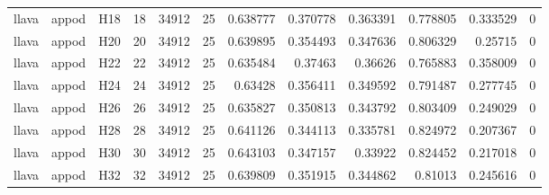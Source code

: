 \begin{longtable}{lllrrrrrrrrr}
llava & appod & H18 & 18 & 34912 & 25 & 0.638777 & 0.370778 & 0.363391 & 0.778805 & 0.333529 & 0 \\
llava & appod & H20 & 20 & 34912 & 25 & 0.639895 & 0.354493 & 0.347636 & 0.806329 & 0.25715 & 0 \\
llava & appod & H22 & 22 & 34912 & 25 & 0.635484 & 0.37463 & 0.36626 & 0.765883 & 0.358009 & 0 \\
llava & appod & H24 & 24 & 34912 & 25 & 0.63428 & 0.356411 & 0.349592 & 0.791487 & 0.277745 & 0 \\
llava & appod & H26 & 26 & 34912 & 25 & 0.635827 & 0.350813 & 0.343792 & 0.803409 & 0.249029 & 0 \\
llava & appod & H28 & 28 & 34912 & 25 & 0.641126 & 0.344113 & 0.335781 & 0.824972 & 0.207367 & 0 \\
llava & appod & H30 & 30 & 34912 & 25 & 0.643103 & 0.347157 & 0.33922 & 0.824452 & 0.217018 & 0 \\
llava & appod & H32 & 32 & 34912 & 25 & 0.639809 & 0.351915 & 0.344862 & 0.81013 & 0.245616 & 0 \\
\end{longtable}
